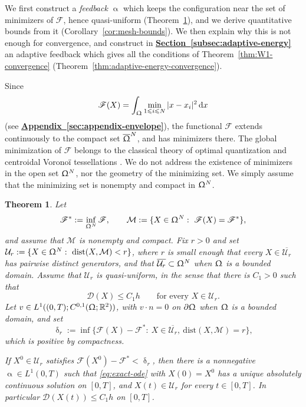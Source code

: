 \documentclass[letterpaper,11pt,twoside]{article}
\numberwithin{figure}{section}
\numberwithin{table}{section}
\theoremstyle{cpamplain}
\newtheorem{theorem}{Theorem}[section]
\theoremstyle{cpamdefinition}
\newcommand{\R}{\mathbb{R}}
\newcommand{\diff}{\mathrm{d}}
\newcommand{\dist}{\mathrm{dist}}
\newcommand{\Secref}[1]{\textbf{\hyperref[#1]{Section~\ref*{#1}}}}
\newcommand{\Appref}[1]{\textbf{\hyperref[#1]{Appendix~\ref*{#1}}}}
\let\alpha\upalpha
\let\delta\updelta
\let\Omega\Upomega
\renewcommand{\le}{\leqslant}
\numberwithin{equation}{section}
\begin{document}
We first construct a \emph{feedback} $\alpha$ which keeps the configuration near the set of minimizers of $\mathscr F$, hence quasi-uniform (Theorem~\ref{thm:alpha-feedback}), and we derive quantitative bounds from it (Corollary~\ref{cor:mesh-bounds}).
We then explain why this is not enough for convergence, and construct in \Secref{subsec:adaptive-energy} an adaptive feedback which gives all the conditions of Theorem~\ref{thm:W1-convergence} (Theorem~\ref{thm:adaptive-energy-convergence}).

Since 
$$
\mathscr F(X)=\int_\Omega\min_{1\le i\le N}|x-x_i|^2\,\diff x
$$ 
(see \Appref{sec:appendix-envelope}), the functional $\mathscr F$ extends continuously to the compact set $\overline\Omega^N$, and has minimizers there.
The global minimization of $\mathscr F$ belongs to the classical theory of optimal quantization and centroidal Vorono\"i tessellations \cite{DuFaberGunzburger1999,GrafLuschgy2000,caglioti2018quantization}.
We do not address the existence of minimizers in the open set $\Omega^N$, nor the geometry of the minimizing set.
We simply assume that the minimizing set is nonempty and compact in $\Omega^N$.

\begin{theorem}\label{thm:alpha-feedback}
Let
\[
\mathscr F^\ast:=\inf_{\Omega^N}\mathscr F,
\qquad
\mathcal M:=\{X\in\Omega^N:\ \mathscr F(X)=\mathscr F^\ast\},
\]
and assume that $\mathcal M$ is nonempty and compact.
Fix $r>0$ and set $\mathcal U_r:=\{X\in\Omega^N:\ \dist(X,\mathcal M)<r\}$, where $r$ is small enough that every $X\in\overline{\mathcal U_r}$ has pairwise distinct generators, and that $\overline{\mathcal U_r}\subset\Omega^N$ when $\Omega$ is a bounded domain.
Assume that $\mathcal U_r$ is quasi-uniform, in the sense that there is $C_1>0$ such that
\begin{equation}\label{eq:H}\tag{H}
\mathscr D(X)\le C_1h
\qquad\text{for every }X\in\mathcal U_r .
\end{equation}
Let $v\in L^1((0,T);C^{0,1}(\Omega;\R^2))$, with $v\cdot n=0$ on $\partial\Omega$ when $\Omega$ is a bounded domain, and set
\[
\delta_r:=\inf\{\mathscr F(X)-\mathscr F^\ast:\ X\in\overline{\mathcal U_r},\ \dist(X,\mathcal M)=r\},
\]
which is positive by compactness.

If $X^0\in\mathcal U_r$ satisfies $\mathscr F(X^0)-\mathscr F^\ast<\delta_r$, then there is a nonnegative $\alpha\in L^1(0,T)$ such that \eqref{eq:exact-ode} with $X(0)=X^0$ has a unique absolutely continuous solution on $[0,T]$, and $X(t)\in\mathcal U_r$ for every $t\in[0,T]$.
In particular $\mathscr D(X(t))\le C_1h$ on $[0,T]$.
\end{theorem}
\end{document}
